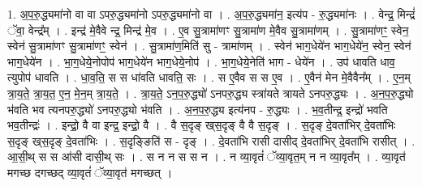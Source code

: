 \documentclass[17pt]{extarticle}
\begin{document}
1. अ॒प॒रु॒द्ध्यमा॑नो वा वा ऽपरु॒द्ध्यमा॑नो ऽपरु॒द्ध्यमा॑नो वा । . अ॒प॒रु॒द्ध्यमा॑न॒ इत्य॑प - रु॒द्ध्यमा॑नः । . वेन्द्र॒ मिन्द्रं॑ ॅवा॒ वेन्द्र᳚म् । . इन्द्र॑ मे॒वैवे न्द्र॒ मिन्द्र॑ मे॒व । . ए॒व सु॒त्रामा॑णꣳ सु॒त्रामा॑ण मे॒वैव सु॒त्रामा॑णम् । . सु॒त्रामा॑णꣳ॒॒ स्वेन॒ स्वेन॑ सु॒त्रामा॑णꣳ सु॒त्रामा॑णꣳ॒॒ स्वेन॑ । . सु॒त्रामा॑ण॒मिति॑ सु - त्रामा॑णम् । . स्वेन॑ भाग॒धेये॑न भाग॒धेये॑न॒ स्वेन॒ स्वेन॑ भाग॒धेये॑न । . भा॒ग॒धेये॒नोपोप॑ भाग॒धेये॑न भाग॒धेये॒नोप॑ । . भा॒ग॒धेये॒नेति॑ भाग - धेये॑न । . उप॑ धावति धाव॒ त्युपोप॑ धावति । . धा॒व॒ति॒ स स धा॑वति धावति॒ सः । . स ए॒वैव स स ए॒व । . ए॒वैन॑ मेन मे॒वैवैन᳚म् । . ए॒न॒म् त्रा॒य॒ते॒ त्रा॒य॒त॒ ए॒न॒ मे॒न॒म् त्रा॒य॒ते॒ । . त्रा॒य॒ते॒ ऽन॒प॒रु॒द्ध्यो॑ ऽनपरु॒द्ध्य स्त्रा॑यते त्रायते ऽनपरु॒द्ध्यः । . अ॒न॒प॒रु॒द्ध्यो भ॑वति भव त्यनपरु॒द्ध्यो॑ ऽनपरु॒द्ध्यो भ॑वति । . अ॒न॒प॒रु॒द्ध्य इत्य॑नप - रु॒द्ध्यः । . भ॒व॒तीन्द्र॒ इन्द्रो॑ भवति भव॒तीन्द्रः॑ । . इन्द्रो॒ वै वा इन्द्र॒ इन्द्रो॒ वै । . वै स॒दृङ् ख्‌स॒दृङ् वै वै स॒दृङ् । . स॒दृङ् दे॒वता॑भिर् दे॒वता॑भिः स॒दृङ् ख्‌स॒दृङ् दे॒वता॑भिः । . स॒दृङ्ङिति॑ स - दृङ् । . दे॒वता॑भि रासी दासीद् दे॒वता॑भिर् दे॒वता॑भि रासीत् । . आ॒सी॒थ् स स आ॑सी दासी॒थ् सः । . स न न स स न । . न व्या॒वृतं॑ ॅव्या॒वृत॒म् न न व्या॒वृत᳚म् । . व्या॒वृत॑ मगच्छ दगच्छद् व्या॒वृतं॑ ॅव्या॒वृत॑ मगच्छत् । \newline
\end{document}
